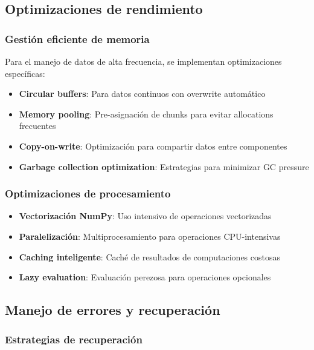 \subsection{Optimizaciones de rendimiento}
\label{subsec:optimizaciones_rendimiento}

\subsubsection{Gestión eficiente de memoria}

Para el manejo de datos de alta frecuencia, se implementan optimizaciones específicas:

\begin{itemize}
    \item \textbf{Circular buffers}: Para datos continuos con overwrite automático
    \item \textbf{Memory pooling}: Pre-asignación de chunks para evitar allocations frecuentes
    \item \textbf{Copy-on-write}: Optimización para compartir datos entre componentes
    \item \textbf{Garbage collection optimization}: Estrategias para minimizar GC pressure
\end{itemize}

\subsubsection{Optimizaciones de procesamiento}

\begin{itemize}
    \item \textbf{Vectorización NumPy}: Uso intensivo de operaciones vectorizadas
    \item \textbf{Paralelización}: Multiprocesamiento para operaciones CPU-intensivas
    \item \textbf{Caching inteligente}: Caché de resultados de computaciones costosas
    \item \textbf{Lazy evaluation}: Evaluación perezosa para operaciones opcionales
\end{itemize}

\subsection{Manejo de errores y recuperación}
\label{subsec:manejo_errores}

\subsubsection{Estrategias de recuperación}


